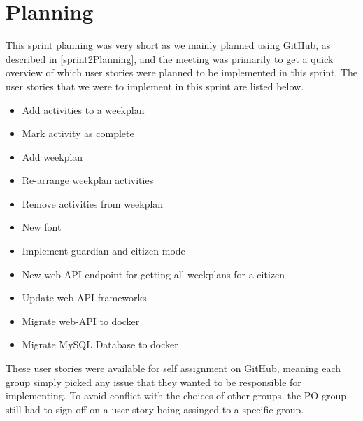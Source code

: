 \section{Planning}
This sprint planning was very short as we mainly planned using GitHub, as described in \autoref{sprint2Planning}, and the meeting was primarily to get a quick overview of which user stories were planned to be implemented in this sprint.
The user stories that we were to implement in this sprint are listed below.

\begin{itemize}
  \item Add activities to a weekplan
  \item Mark activity as complete
  \item Add weekplan
  \item Re-arrange weekplan activities
  \item Remove activities from weekplan
  \item New font
  \item Implement guardian and citizen mode
  \item New web-API endpoint for getting all weekplans for a citizen
  \item Update web-API frameworks
  \item Migrate web-API to docker
  \item Migrate MySQL Database to docker
\end{itemize}

These user stories were available for self assignment on GitHub, meaning each group simply picked any issue that they wanted to be responsible for implementing.
To avoid conflict with the choices of other groups, the PO-group still had to sign off on a user story being assinged to a specific group.
